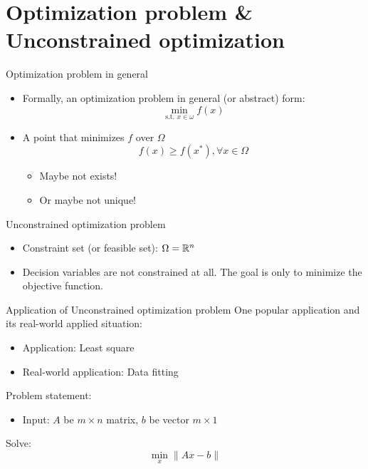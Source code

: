 \section{Optimization problem \& Unconstrained optimization}

\begin{frame}{Optimization problem in general}
    \begin{itemize}
        \item Formally, an optimization problem in general (or abstract) form:
        \begin{equation}
            \underset{\text{s.t. } x \in \omega}{\min}f(x)
        \end{equation}
        \item A point that minimizes $f$ over $\Omega$
        \begin{equation}
            f(x) \geq f(x^*), \forall x \in \Omega
        \end{equation}
        \begin{itemize}
            \item Maybe not exists!
            \item Or maybe not unique!
        \end{itemize}
    \end{itemize}    
\end{frame}

\begin{frame}{Unconstrained optimization problem}
    \begin{itemize}
        \item Constraint set (or feasible set): $\Omega = \mathbb{R}^n$
        \item Decision variables are not constrained at all. The goal is only to minimize the objective function.
    \end{itemize}
\end{frame}

\begin{frame}{Application of Unconstrained optimization problem}
    One popular application and its real-world applied situation:
    \begin{itemize}
        \item Application: Least square
        \item Real-world application: Data fitting
    \end{itemize}
    Problem statement:
    \begin{itemize}
        \item Input: $A$ be $m \times n$ matrix, $b$ be vector $m \times 1$
    \end{itemize}
    Solve:
    \begin{equation}
        \underset{x}{\min}\|Ax - b\|
    \end{equation}
\end{frame}

